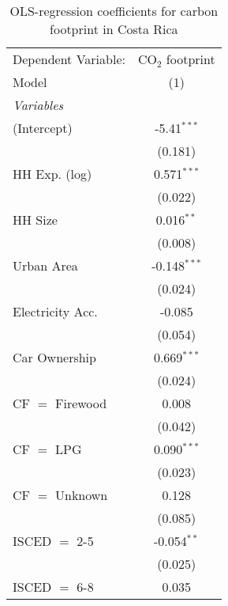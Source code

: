 
\begin{table}[htbp!]
   \centering
   \small
   \begin{adjustbox}{width = 1\textwidth, max height = 0.95\textheight, center}
      \begin{threeparttable}[b]
         \caption{\label{tab:OLS_2_CRI} OLS-regression coefficients for carbon footprint in Costa Rica}
         \begin{tabular}{lc}
            \tabularnewline \midrule \midrule
            Dependent Variable: & CO$_{2}$ footprint\\  
            Model               & (1)\\  
            \midrule
            \emph{Variables}\\
            (Intercept)         & -5.41$^{***}$\\   
                                & (0.181)\\   
            HH Exp. (log)       & 0.571$^{***}$\\   
                                & (0.022)\\   
            HH Size             & 0.016$^{**}$\\   
                                & (0.008)\\   
            Urban Area          & -0.148$^{***}$\\   
                                & (0.024)\\   
            Electricity Acc.    & -0.085\\   
                                & (0.054)\\   
            Car Ownership       & 0.669$^{***}$\\   
                                & (0.024)\\   
            CF $=$ Firewood     & 0.008\\   
                                & (0.042)\\   
            CF $=$ LPG          & 0.090$^{***}$\\   
                                & (0.023)\\   
            CF $=$ Unknown      & 0.128\\   
                                & (0.085)\\   
            ISCED $=$ 2-5       & -0.054$^{**}$\\   
                                & (0.025)\\   
            ISCED $=$ 6-8       & 0.035\\   

\end{tabular}
\end{threeparttable}
\end{adjustbox}
\end{table}
